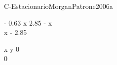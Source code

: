
\begin{bilevelmodel}{C-Estacionario}{MorganPatrone2006a}
    \begin{upperlevel}{- 0.63 x}{
         2.85 - x  \\ 
 x - 2.85 
    }
    \end{upperlevel}
    \begin{lowerlevel}{x y}{
         0  \\ 
 0 
    }
    \end{lowerlevel}
\end{bilevelmodel}
    
        